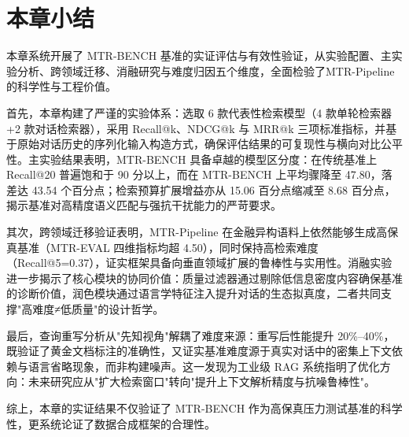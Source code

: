 \section{本章小结}
\label{sec:chapter7_summary}

本章系统开展了 MTR-BENCH 基准的实证评估与有效性验证，从实验配置、主实验分析、跨领域迁移、消融研究与难度归因五个维度，全面检验了MTR-Pipeline的科学性与工程价值。

首先，本章构建了严谨的实验体系：选取 6 款代表性检索模型（4 款单轮检索器 +2 款对话检索器），采用 Recall@k、NDCG@k 与 MRR@k 三项标准指标，并基于原始对话历史的序列化输入构造方式，确保评估结果的可复现性与横向对比公平性。主实验结果表明，MTR-BENCH 具备卓越的模型区分度：在传统基准上 Recall@20 普遍饱和于 90 分以上，而在 MTR-BENCH 上平均骤降至 47.80，落差达 43.54 个百分点；检索预算扩展增益亦从 15.06 百分点缩减至 8.68 百分点，揭示基准对高精度语义匹配与强抗干扰能力的严苛要求。

其次，跨领域迁移验证表明，MTR-Pipeline 在金融异构语料上依然能够生成高保真基准（MTR-EVAL 四维指标均超 4.50），同时保持高检索难度（Recall@5=0.37），证实框架具备向垂直领域扩展的鲁棒性与实用性。消融实验进一步揭示了核心模块的协同价值：质量过滤器通过剔除低信息密度内容确保基准的诊断价值，润色模块通过语言学特征注入提升对话的生态拟真度，二者共同支撑"高难度≠低质量"的设计哲学。

最后，查询重写分析从"先知视角"解耦了难度来源：重写后性能提升 20\%--40\%，既验证了黄金文档标注的准确性，又证实基准难度源于真实对话中的密集上下文依赖与语言省略现象，而非构建噪声。这一发现为工业级 RAG 系统指明了优化方向：未来研究应从"扩大检索窗口"转向"提升上下文解析精度与抗噪鲁棒性"。

综上，本章的实证结果不仅验证了 MTR-BENCH 作为高保真压力测试基准的科学性，更系统论证了数据合成框架的合理性。


